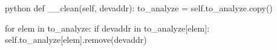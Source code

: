 \begin{mintedbox}{python}
def __clean(self, devaddr):
    to_analyze = self.to_analyze.copy()

    for elem in to_analyze:
        if devaddr in to_analyze[elem]:
            self.to_analyze[elem].remove(devaddr)
\end{mintedbox}

